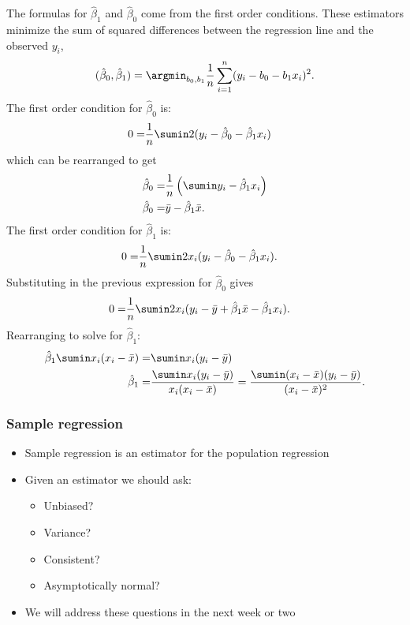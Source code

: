 The formulas for $\hat{\beta}_1$ and $\hat{\beta}_0$ come from the
first order conditions.  These estimators minimize the sum of squared
differences between the regression line and the observed $y_i$, 
\[ (\hat{\beta}_0, \hat{\beta}_1) = \argmin_{b_0,b_1}
\frac{1}{n}\sum_{i=1}^n (y_i - b_0 - b_1 x_i)^2. \] 
The first order condition for $\hat{\beta}_0$ is:
\begin{align*}
  0 = & \frac{1}{n} \sumin 2(y_i - \hat{\beta}_0 - \hat{\beta}_1 x_i ) 
\end{align*}
which can be rearranged to get
\begin{align*}
  \hat{\beta}_0 = & \frac{1}{n} \left(\sumin y_i - \hat{\beta}_1 x_i
  \right) \\
  \hat{\beta}_0 = & \bar{y} - \hat{\beta}_1 \bar{x}.
\end{align*}
The first order condition for $\hat{\beta}_1$ is: 
\begin{align*}
  0 = & \frac{1}{n} \sumin 2x_i (y_i - \hat{\beta}_0 - \hat{\beta}_1 x_i ).
\end{align*}
Substituting in the previous expression for $\hat{\beta}_0$ gives
\begin{align*}
  0 = & \frac{1}{n} \sumin 2 x_i (y_i - \bar{y} + \hat{\beta}_1 \bar{x} - \hat{\beta}_1 x_i ). 
\end{align*}
Rearranging to solve for $\hat{\beta}_1$:
\begin{align*}
  \hat{\beta}_1 \sumin x_i(x_i - \bar{x}) = & \sumin x_i (y_i -
  \bar{y}) \\
  \hat{\beta}_1 = & \frac{\sumin x_i (y_i - \bar{y})}{ x_i (x_i -
    \bar{x}) } = \frac{\sumin (x_i - \bar{x}) (y_i - \bar{y})}{ (x_i -
    \bar{x})^2 }.
\end{align*}

\begin{frame}
  \frametitle{Sample regression}
  \begin{itemize}
  \item Sample regression is an estimator for the population
    regression
  \item Given an estimator we should ask:
    \begin{itemize}
    \item Unbiased?
    \item Variance?
    \item Consistent?
    \item Asymptotically normal?
    \end{itemize}
  \item We will address these questions in the next week or two  
  \end{itemize}
\end{frame}

